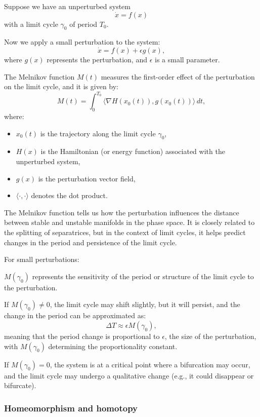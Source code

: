\documentclass{article}
\theoremstyle{definition}
\theoremstyle{remark}
\begin{document}
Suppose we have an unperturbed system
\[
\dot{x} = f(x)
\]
with a limit cycle \(\gamma_0\) of period \(T_0\).

Now we apply a small perturbation to the system:
\[
\dot{x} = f(x) + \epsilon g(x),
\]
where \(g(x)\) represents the perturbation, and \(\epsilon\) is a small parameter.

The Melnikov function \(M(t)\) measures the first-order effect of the perturbation on the limit cycle, and it is given by:
\[
M(t) = \int_0^{T_0} \langle \nabla H(x_0(t)), g(x_0(t)) \rangle \, dt,
\]
where:
\begin{itemize}
    \item \(x_0(t)\) is the trajectory along the limit cycle \(\gamma_0\),
    \item \(H(x)\) is the Hamiltonian (or energy function) associated with the unperturbed system,
    \item \(g(x)\) is the perturbation vector field,
    \item \(\langle \cdot, \cdot \rangle\) denotes the dot product.
\end{itemize}

The Melnikov function tells us how the perturbation influences the distance between stable and unstable manifolds in the phase space. It is closely related to the splitting of separatrices, but in the context of limit cycles, it helps predict changes in the period and persistence of the limit cycle.

For small perturbations:

\(M(\gamma_0)\) represents the sensitivity of the period or structure of the limit cycle to the perturbation.

If \(M(\gamma_0) \neq 0\), the limit cycle may shift slightly, but it will persist, and the change in the period can be approximated as:
\[
\Delta T \approx \epsilon M(\gamma_0),
\]
meaning that the period change is proportional to \(\epsilon\), the size of the perturbation, with \(M(\gamma_0)\) determining the proportionality constant.

If \(M(\gamma_0) = 0\), the system is at a critical point where a bifurcation may occur, and the limit cycle may undergo a qualitative change (e.g., it could disappear or bifurcate).



\subsubsection{Homeomorphism and homotopy}
\end{document}
